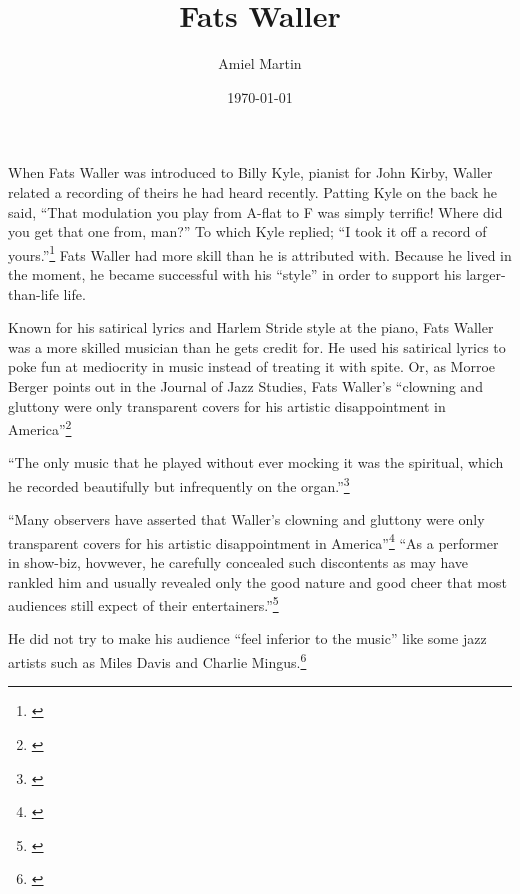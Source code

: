 \documentclass[11pt]{report}
\title{Fats Waller}
\author{Amiel Martin}
\date{\today}
\begin{document}
	\maketitle
	
	
	\label{sec:introduction}
	
		When Fats Waller was introduced to Billy Kyle, pianist for John Kirby, Waller related a recording of theirs he had heard recently. Patting Kyle on the back he said, ``That modulation you play from A-flat to F was simply terrific! Where did you get that one from, man?'' To which Kyle replied; ``I took it off a record of yours.''\footnote{\cite[231]{anecdotes}}
		Fats Waller had more skill than he is attributed with. Because he lived in the moment, he became successful with his ``style'' in order to support his larger-than-life life.
		
		Known for his satirical lyrics and Harlem Stride style at the piano, Fats Waller was a more skilled musician than he gets credit for. He used his satirical lyrics to poke fun at mediocrity in music instead of treating it with spite. Or, as Morroe Berger points out in the Journal of Jazz Studies, Fats Waller's ``clowning and gluttony were only transparent covers for his artistic disappointment in America''\footnote{\cite[4]{outside-insider}}
		
		
		``The only music that he played without ever mocking it was the spiritual, which he recorded beautifully but infrequently on the organ.''\footnote{\cite[8]{outside-insider}}
		
		``Many observers have asserted that Waller's clowning and gluttony were only transparent covers for his artistic disappointment in America''\footnote{\cite[4]{outside-insider}} ``As a performer in show-biz, hovwever, he carefully concealed such discontents as may have rankled him and usually revealed only the good nature and good cheer that most audiences still expect of their entertainers.''\footnote{\cite[4]{outside-insider}}
		
		He did not try to make his audience ``feel inferior to the music'' like some jazz artists such as Miles Davis and Charlie Mingus.\footnote{\cite[16]{outside-insider}}
		
		
		
		
	
	
	
\end{document}
